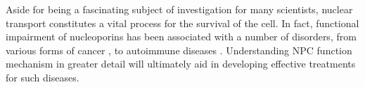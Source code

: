 \noindent Aside for being a fascinating subject of investigation for many scientists, nuclear transport constitutes a vital process for the survival of the cell. In fact, functional impairment of nucleoporins has been associated with a number of disorders, from various forms of cancer \cite{Cronshaw2004}, to autoimmune diseases \cite{Duarte-Rey2012}. Understanding NPC function mechanism in greater detail will ultimately aid in developing effective treatments for such diseases.

